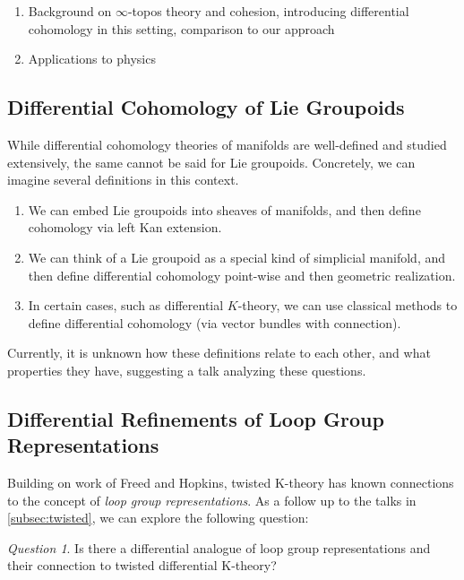 \documentclass[a4paper]{book}
\theoremstyle{definition}
\theoremstyle{remark}
\newtheorem{question}[equation]{Question}
\numberwithin{equation}{section}
\begin{document}
\begin{enumerate}
  \item Background on $\infty$-topos theory and cohesion, introducing differential cohomology in this setting, comparison to our approach \cite{lurie2009htt,schreiber2013differentialcohomology}
  \item Applications to physics \cite{fiorenzasatischreiber2024charactermap}
\end{enumerate}

\subsection{Differential Cohomology of Lie Groupoids} \label{subsec:liegroupoids}
While differential cohomology theories of manifolds are well-defined and studied extensively, the same cannot be said for Lie groupoids. Concretely, we can imagine several definitions in this context.

\begin{enumerate}
  \item We can embed Lie groupoids into sheaves of manifolds, and then define cohomology via left Kan extension. 
  \item We can think of a Lie groupoid as a special kind of simplicial manifold, and then define differential cohomology point-wise and then geometric realization.
  \item In certain cases, such as differential $K$-theory, we can use classical methods to define differential cohomology (via vector bundles with connection).
\end{enumerate}

Currently, it is unknown how these definitions relate to each other, and what properties they have, suggesting a talk analyzing these questions.

\subsection{Differential Refinements of Loop Group Representations} \label{subsec:loopgroup}
Building on work of Freed and Hopkins, twisted K-theory has known connections to the concept of \emph{loop group representations}.  As a follow up to the talks in \cref{subsec:twisted}, we can explore the following question:

\begin{question}
 Is there a differential analogue of loop group representations and their connection to twisted differential K-theory?
\end{question}
\end{document}
